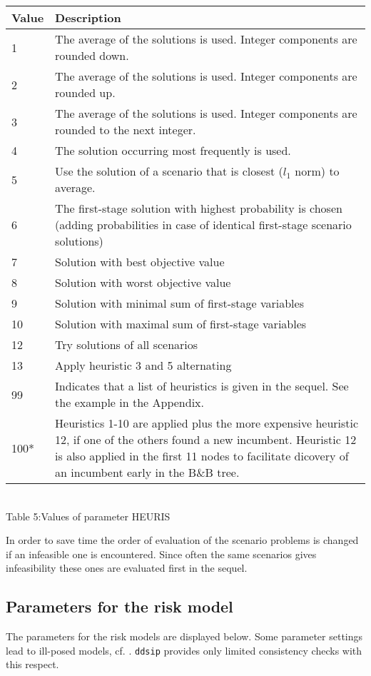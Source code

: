 \documentclass[11pt,draft]{article}
\newcommand{\+}{{\ti{+}}}
\newcommand{\1}{{\ti{1}}}
\begin{document}
\begin{center}
\begin{tabular}{|lp{11.2cm}|} 
\hline
Value&Description\\ \hline
1&The average of the solutions is used. Integer components are rounded down.\medskip\\
2&The average of the solutions is used. Integer components are rounded up.\medskip\\
3&The average of the solutions is used. Integer components are rounded to the
next integer.\medskip\\
4&The solution occurring most frequently is used.\medskip\\
5&Use the solution of a scenario that is closest ($l_1$ norm) to average.\medskip\\
6&The first-stage solution with highest probability is chosen (adding probabilities in case of identical first-stage scenario solutions)\medskip\\
7&Solution with best objective value\medskip\\
8&Solution with worst objective value\medskip\\
9&Solution with minimal sum of first-stage variables\medskip\\
10&Solution with maximal sum of first-stage variables\medskip\\
12&Try solutions of all scenarios\medskip\\
13&Apply heuristic 3 and 5 alternating\medskip\\
99&Indicates that a list of heuristics is given in the sequel. See the example in the Appendix.\\
100*&Heuristics 1-10 are applied plus the more expensive heuristic 12, if one of the others found a new incumbent. Heuristic 12 is also applied in the first 11 nodes to facilitate dicovery of an incumbent early in the B\&B tree.\\
\hline
\end{tabular}
\\[0.5em]Table 5:\quad Values of parameter HEURIS\\
\end{center} %
%
\setcounter{table}{4}
%
In order to save time the order of evaluation of the scenario problems is changed if an infeasible one is encountered.
Since often the same scenarios gives infeasibility these ones are evaluated first in the sequel.
\subsection{Parameters for the risk model}
The parameters for the risk models are displayed below. Some parameter settings lead to
ill-posed models, cf. \cite{diss}. \texttt{ddsip} provides only limited consistency checks with this
respect.  
\end{document}
